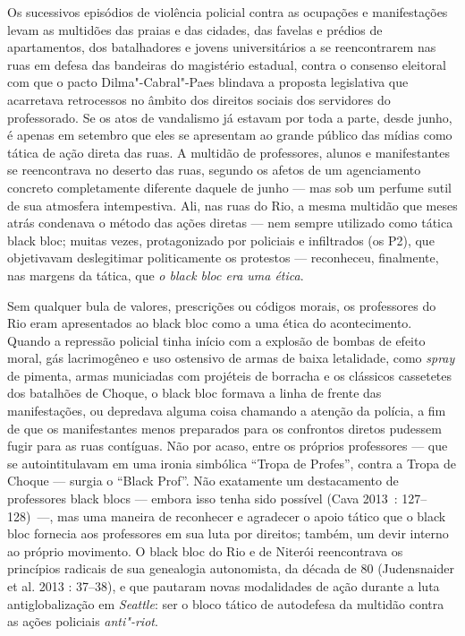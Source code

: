 Os sucessivos episódios de violência policial contra as ocupações e
manifestações levam as multidões das praias e das cidades, das favelas e
prédios de apartamentos, dos batalhadores e jovens universitários a se
reencontrarem nas ruas em defesa das bandeiras do magistério estadual,
contra o consenso eleitoral com que o pacto Dilma"-Cabral"-Paes blindava a
proposta legislativa que acarretava retrocessos no âmbito dos direitos
sociais dos servidores do professorado. Se os atos de vandalismo já
estavam por toda a parte, desde junho, é apenas em setembro que eles se
apresentam ao grande público das mídias como tática de ação direta das
ruas. A multidão de professores, alunos e manifestantes se reencontrava
no deserto das ruas, segundo os afetos de um agenciamento concreto
completamente diferente daquele de junho --- mas sob um perfume sutil de
sua atmosfera intempestiva. Ali, nas ruas do Rio, a mesma multidão que
meses atrás condenava o método das ações diretas --- nem sempre utilizado
como tática black bloc; muitas vezes, protagonizado por policiais e
infiltrados (os P2), que objetivavam deslegitimar politicamente os
protestos --- reconheceu, finalmente, nas margens da tática, que \emph{o
black bloc era uma ética}.

Sem qualquer bula de valores, prescrições ou códigos morais, os
professores do Rio eram apresentados ao black bloc como a uma ética do
acontecimento. Quando a repressão policial tinha início com a explosão
de bombas de efeito moral, gás lacrimogêneo e uso ostensivo de armas de
baixa letalidade, como \emph{spray }de pimenta, armas municiadas com
projéteis de borracha e os clássicos cassetetes dos batalhões de Choque,
o black bloc formava a linha de frente das manifestações, ou depredava
alguma coisa chamando a atenção da polícia, a fim de que os
manifestantes menos preparados para os confrontos diretos pudessem fugir
para as ruas contíguas. Não por acaso, entre os próprios professores ---
que se autointitulavam em uma ironia simbólica ``Tropa de Profes'',
contra a Tropa de Choque --- surgia o ``Black Prof''. Não exatamente um
destacamento de professores black blocs --- embora isso tenha sido
possível (Cava 2013~: 127--128)~---, mas uma maneira de reconhecer e
agradecer o apoio tático que o black bloc fornecia aos professores em
sua luta por direitos; também, um devir interno ao próprio movimento. O
black bloc do Rio e de Niterói reencontrava os princípios radicais de
sua genealogia autonomista, da década de 80 (Judensnaider et al. 2013 :
37--38), e que pautaram novas modalidades de ação durante a luta
antiglobalização em \emph{Seattle}: ser o bloco tático de autodefesa da
multidão contra as ações policiais \emph{anti"-riot}.

